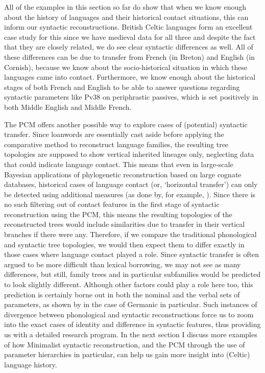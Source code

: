\documentclass[output=paper,colorlinks,citecolor=brown]{langscibook}
\begin{document}
\noindent All of the examples in this section so far do show that when we know enough about the history of languages and their historical contact situations, this can inform our syntactic reconstructions. British Celtic languages form an excellent case study for this since we have medieval data for all three and despite the fact that they are closely related, we do see clear syntactic differences as well. All of these differences can be due to transfer from French (in Breton) and English (in Cornish), because we know about the socio-historical situation in which these languages came into contact. Furthermore, we know enough about the historical stages of both French and English to be able to answer questions regarding syntactic parameters like Pv38 on periphrastic passives, which is set positively in both Middle English and Middle French.

The PCM offers another possible way to explore cases of (potential) syntactic transfer. Since loanwords are essentially cast aside before applying the comparative method to reconstruct language families, the resulting tree topologies are supposed to show vertical inherited lineages only, neglecting data that could indicate language contact. This means that even in large-scale Bayesian applications of phylogenetic reconstruction based on large cognate databases, historical cases of language contact (or, `horizontal transfer') can only be detected using additional measures (as done by, for example, \citealt{mm:neureiter2022detecting}). Since there is no such filtering out of contact features in the first stage of syntactic reconstruction using the PCM, this means the resulting topologies of the reconstructed trees would include similarities due to transfer in their vertical branches if there were any. Therefore, if we compare the traditional phonological and syntactic tree topologies, we would then expect them to differ exactly in those cases where language contact played a role. Since syntactic transfer is often argued to be more difficult than lexical borrowing, we may not see as many differences, but still, family trees and in particular subfamilies would be predicted to look slightly different. Although other factors could play a role here too, this prediction is certainly borne out in both the nominal and the verbal sets of parameters, as shown by \citet{mm:bakerroberts2024} in the case of Germanic in particular. Such instances of divergence between phonological and syntactic reconstructions force us to zoom into the exact cases of identity and difference in syntactic features, thus providing us with a detailed research program. In the next section I discuss more examples of how Minimalist syntactic reconstruction, and the PCM through the use of parameter hierarchies in particular, can help us gain more insight into (Celtic) language history.
\end{document}
